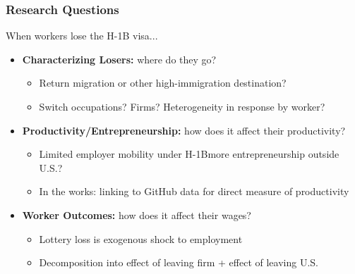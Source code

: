 \documentclass[xcolor=dvipsnames, compress, 12pt, aspectratio=169, handout]{beamer}
\begin{document}
\begin{frame}
    \frametitle{Research Questions}
    When workers lose the H-1B visa...
    \vspace{2mm}
    \begin{itemize}
        \item \textbf{Characterizing Losers:} where do they go?
        \begin{itemize}
            \item Return migration or other high-immigration destination?
            \item Switch occupations? Firms? Heterogeneity in response by worker?
        \end{itemize}
        \vspace{3mm}
        \item \textbf{Productivity/Entrepreneurship:} how does it affect their productivity?
        \begin{itemize}
            \item Limited employer mobility under H-1B\textemdash more entrepreneurship outside U.S.?
            \item In the works: linking to GitHub data for direct measure of productivity 
        \end{itemize}
        \vspace{3mm}
        \item \textbf{Worker Outcomes:} how does it affect their wages?
        \begin{itemize}
            \item Lottery loss is exogenous shock to employment
            \item Decomposition into effect of leaving firm + effect of leaving U.S.
        \end{itemize}
    \end{itemize}
\end{frame}
\end{document}
